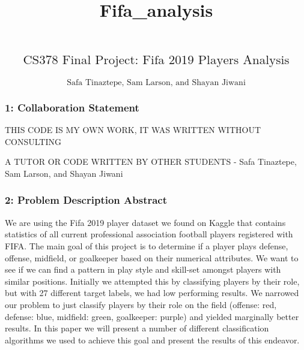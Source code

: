 \documentclass[11pt]{article}
\title{Fifa\_analysis}
\begin{document}
    
    
    \maketitle
    
    

    
    \hypertarget{textcs378-final-project-fifa-2019-players-analysis}{%
\subsection{\texorpdfstring{\[\text{CS378 Final Project: Fifa 2019 Players Analysis}\]}{\textbackslash{}text\{CS378 Final Project: Fifa 2019 Players Analysis\}}}\label{textcs378-final-project-fifa-2019-players-analysis}}

\hypertarget{textsafa-tinaztepe-sam-larson-and-shayan-jiwani}{%
\paragraph{\texorpdfstring{\[ \text{Safa Tinaztepe, Sam Larson, and Shayan Jiwani} \]}{ \textbackslash{}text\{Safa Tinaztepe, Sam Larson, and Shayan Jiwani\} }}\label{textsafa-tinaztepe-sam-larson-and-shayan-jiwani}}

    \hypertarget{collaboration-statement}{%
\subsubsection{1: Collaboration
Statement}\label{collaboration-statement}}

    THIS CODE IS MY OWN WORK, IT WAS WRITTEN WITHOUT CONSULTING

A TUTOR OR CODE WRITTEN BY OTHER STUDENTS - Safa Tinaztepe, Sam Larson,
and Shayan Jiwani

    \hypertarget{problem-description-abstract}{%
\subsubsection{2: Problem Description \textbar{}
Abstract}\label{problem-description-abstract}}

    We are using the Fifa 2019 player dataset we found on Kaggle that
contains statistics of all current professional association football
players registered with FIFA. The main goal of this project is to
determine if a player plays defense, offense, midfield, or goalkeeper
based on their numerical attributes. We want to see if we can find a
pattern in play style and skill-set amongst players with similar
positions. Initially we attempted this by classifying players by their
role, but with 27 different target labels, we had low performing
results. We narrowed our problem to just classify players by their role
on the field (offense: red, defense: blue, midfield: green, goalkeeper:
purple) and yielded marginally better results. In this paper we will
present a number of different classification algorithms we used to
achieve this goal and present the results of this endeavor.
\end{document}
